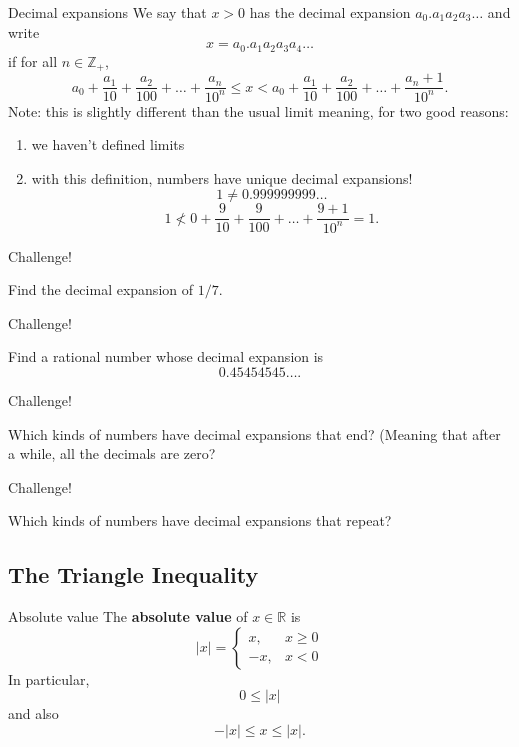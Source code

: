 \documentclass{beamer}
\begin{document}
\begin{frame}{Decimal expansions}
We say that $x>0$ has the decimal expansion $a_0.a_1a_2a_3\dots$ and write
$$x = a_0.a_1a_2a_3a_4\dots$$
\pause
if for all $n\in\mathbb{Z}_+$,
$$a_0 + \frac{a_1}{10} + \frac{a_2}{100} + \dots + \frac{a_n}{10^n}
\leq x < a_0 + \frac{a_1}{10} + \frac{a_2}{100} + \dots + \frac{a_n+1}{10^n}.
$$
\pause
Note: this is slightly different than the usual limit meaning, for two good reasons:
\begin{enumerate}
\pause
\item we haven't defined limits
\pause
\item with this definition, numbers have unique decimal expansions!
\pause
$$1\neq 0.999999999\dots$$
\pause
$$1 \nless 0 + \frac{9}{10} + \frac{9}{100} + \dots + \frac{9+1}{10^n} = 1.$$
\end{enumerate}
\end{frame}

\begin{frame}{Challenge!}
\begin{prob}
Find the decimal expansion of $1/7$.
\end{prob}
\end{frame}

\begin{frame}{Challenge!}
\begin{prob}
Find a rational number whose decimal expansion is 
$$0.45454545\dots.$$
\end{prob}
\end{frame}

\begin{frame}{Challenge!}
\begin{prob}
Which kinds of numbers have decimal expansions that end?  (Meaning that after a while, all the decimals are zero?
\end{prob}
\end{frame}

\begin{frame}{Challenge!}
\begin{prob}
Which kinds of numbers have decimal expansions that repeat?
\end{prob}
\end{frame}

\subsection{The Triangle Inequality}

\begin{frame}{Absolute value}
The \textbf{absolute value} of $x\in \mathbb{R}$ is
$$\lvert x \rvert = \left\lbrace\begin{array}{cc}
 x,& x \geq 0\\
-x,& x < 0
\end{array}\right.$$
In particular,
$$0\leq \lvert x\rvert$$
and also
$$-\lvert x\rvert\leq x \leq \lvert x\rvert.$$
\end{frame}
\end{document}
